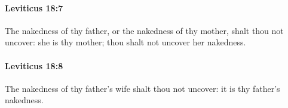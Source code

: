 		\paragraph{Leviticus 18:7} %
			\label{LEVITICUS-18-7}

			The nakedness of thy father, or the nakedness of thy mother, shalt thou not uncover: she is thy mother; thou shalt not uncover her nakedness.


		\paragraph{Leviticus 18:8} %
			\label{LEVITICUS-18-8}

			The nakedness of thy father’s wife shalt thou not uncover: it is thy father’s nakedness.


